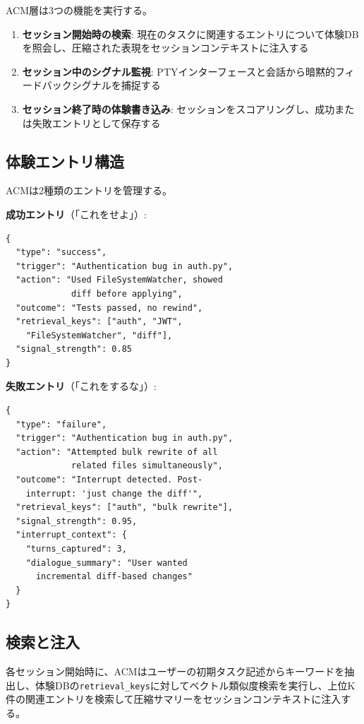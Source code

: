 \documentclass[conference]{IEEEtran}
\begin{document}
ACM層は3つの機能を実行する。

\begin{enumerate}
\item \textbf{セッション開始時の検索}: 現在のタスクに関連するエントリについて体験DBを照会し、圧縮された表現をセッションコンテキストに注入する
\item \textbf{セッション中のシグナル監視}: PTYインターフェースと会話から暗黙的フィードバックシグナルを捕捉する
\item \textbf{セッション終了時の体験書き込み}: セッションをスコアリングし、成功または失敗エントリとして保存する
\end{enumerate}

\subsection{体験エントリ構造}

ACMは2種類のエントリを管理する。

\textbf{成功エントリ}（「これをせよ」）:
\begin{lstlisting}
{
  "type": "success",
  "trigger": "Authentication bug in auth.py",
  "action": "Used FileSystemWatcher, showed
             diff before applying",
  "outcome": "Tests passed, no rewind",
  "retrieval_keys": ["auth", "JWT",
    "FileSystemWatcher", "diff"],
  "signal_strength": 0.85
}
\end{lstlisting}

\textbf{失敗エントリ}（「これをするな」）:
\begin{lstlisting}
{
  "type": "failure",
  "trigger": "Authentication bug in auth.py",
  "action": "Attempted bulk rewrite of all
             related files simultaneously",
  "outcome": "Interrupt detected. Post-
    interrupt: 'just change the diff'",
  "retrieval_keys": ["auth", "bulk rewrite"],
  "signal_strength": 0.95,
  "interrupt_context": {
    "turns_captured": 3,
    "dialogue_summary": "User wanted
      incremental diff-based changes"
  }
}
\end{lstlisting}

\subsection{検索と注入}

各セッション開始時に、ACMはユーザーの初期タスク記述からキーワードを抽出し、体験DBの\texttt{retrieval\_keys}に対してベクトル類似度検索を実行し、上位K件の関連エントリを検索して圧縮サマリーをセッションコンテキストに注入する。
\end{document}
